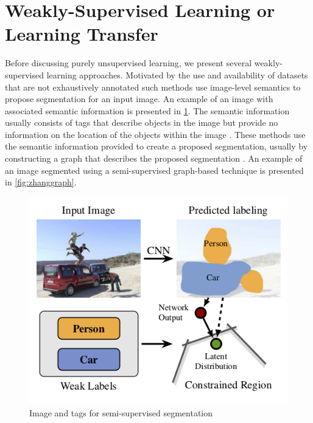 \documentclass[letterpaper, 10 pt, conference]{ieeeconf}  %
\begin{document}
\section{Weakly-Supervised Learning or Learning Transfer} 
Before discussing purely unsupervised learning, we present several weakly-supervised learning approaches. Motivated by the use and availability of datasets that are not exhaustively annotated such methods use image-level semantics to propose segmentation for an input image. An example of an image with associated semantic information is presented in \ref{fig:pathakfig}. The semantic information usually consists of tags that describe objects in the image but provide no information on the location of the objects within the image \cite{zhang2014probabilistic}. These methods use the semantic information provided to create a proposed segmentation, usually by constructing a graph that describes the proposed segmentation \cite{Pathak_2015_ICCV} \cite{zhang2014representative}. An example of an image segmented using a semi-supervised graph-based technique is presented in \ref{fig:zhanggraph}.

\begin{figure}
  \includegraphics[width=\linewidth]{images/pathaktaggedimage.png}
  \caption{Image and tags for semi-supervised segmentation \cite{Pathak_2015_ICCV}}
  \label{fig:pathakfig}
\end{figure}
\end{document}
